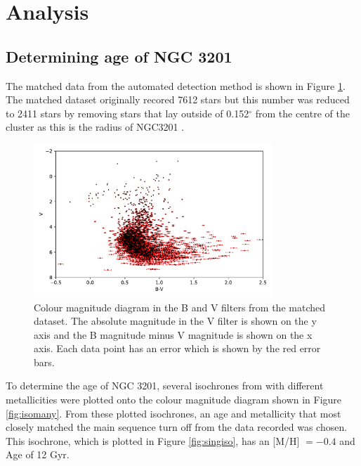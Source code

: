 \documentclass[11pt]{article}
\begin{document}
\pagebreak
\section{Analysis}

\subsection{Determining age of NGC 3201}

The matched data from the automated detection method is shown in Figure \ref{fig:origin}. The matched dataset originally recored 7612 stars but this number was reduced to 2411 stars by removing stars that lay outside of 0.152$^{\circ}$ from the centre of the cluster as this is the radius of NGC3201 \citep{radius}. 

\begin{figure}[H]
	\centering
	\includegraphics[width=0.8\textwidth]{../Figures/errobar}
	\caption{Colour magnitude diagram in the B and V filters from the matched dataset. The absolute magnitude in the V filter is shown on the y axis and the B magnitude minus V magnitude is shown on the x axis. Each data point has an error which is shown by the red error bars.}
	\label{fig:origin}
\end{figure}

To determine the age of NGC 3201, several isochrones from \citet{iso} with different metallicities were plotted onto the colour magnitude diagram shown in Figure \ref{fig:isomany}. From these plotted isochrones, an age and metallicity that most closely matched the main sequence turn off from the data recorded was chosen. This isochrone, which is plotted in Figure \ref{fig:singiso}, has an [M/H] $= -0.4$ and Age of 12 Gyr. 
\end{document}
